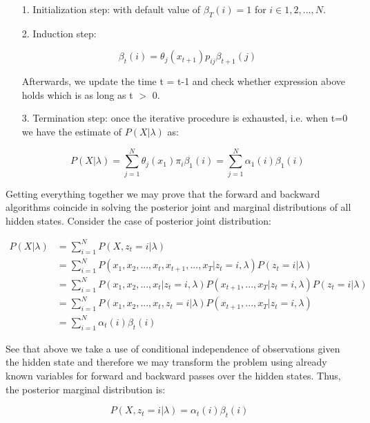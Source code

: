 \begin{itemize}
\item[1.] Initialization step: with default value of $\beta_T(i) = 1$ for $i \in {1,2,...,N}$. 
\item[2.] Induction step: 

\begin{equation}
\beta_t(i) = \theta_j(x_{t+1})p_{ij} \beta_{t+1}(j)
\end{equation}

Afterwards, we update the time t = t-1 and check whether expression above holds which is as long as t $>$ 0.
\item[3.] Termination step: once the iterative procedure is exhausted, i.e. when t=0 we have the estimate of $P(X|\lambda)$ as:

\begin{equation}
P(X|\lambda) = \sum_{j=1}^N \theta_j(x_{1})\pi_{i} \beta_{1}(i) = \sum_{j=1}^N \alpha_1(i)  \beta_{1}(i)
\end{equation}

\end{itemize}

Getting everything together we may prove that the forward and backward algorithms coincide in solving the posterior joint and marginal distributions of all hidden states. Consider the case of posterior joint distribution:

\begin{align}
P(X|\lambda) &= \sum_{i=1}^N P(X,z_t=i|\lambda) \\ \nonumber
&= \sum_{i=1}^N P(x_1,x_2,...,x_{t},x_{t+1},...,x_{T}|z_t=i,\lambda) P(z_t = i|\lambda) \\ \nonumber
&= \sum_{i=1}^N P(x_1,x_2,...,x_{t}|z_t=i,\lambda) P(x_{t+1},...,x_{T}|z_t=i,\lambda) P(z_t = i|\lambda) \\ \nonumber
&= \sum_{i=1}^N P(x_1,x_2,...,x_{t},z_t=i|\lambda) P(x_{t+1},...,x_{T}|z_t=i,\lambda) \\ \nonumber
&= \sum_{i=1}^N \alpha_{t}(i) \beta_t(i) 
\end{align}

See that above we take a use of conditional independence of observations given the hidden state and therefore we may transform the problem using already known variables for forward and backward passes over the hidden states. Thus, the posterior marginal distribution is:

\begin{equation}
P(X, z_t=i|\lambda) = \alpha_t(i) \beta_t(i)
\end{equation}

